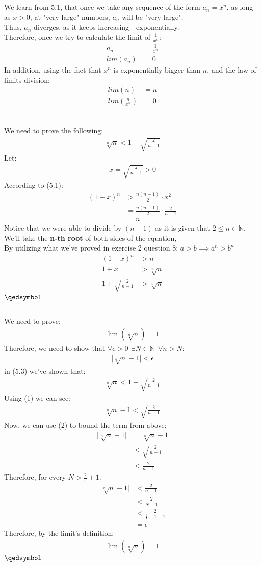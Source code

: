 \documentclass[a4paper, 12pt]{article}
\newcommand{\sub}[1]{\subsection{\underline{#1}}}
\newcommand{\N}{\ensuremath{\mathbb{N}}}
\newcommand{\eq}[1]{\begin{align*}#1\end{align*}}
\newcommand{\eqn}[1]{\begin{align}#1\end{align}}
\renewcommand{\qed}{\hfill\(\qedsymbol\)}
\begin{document}
\section{}
\setcounter{subsection}{1}
\sub{}
We learn from 5.1, that once we take any sequence of the form $a_n=x^n$, as long as $x>0$, at "very large" numbers, $a_n$ will be "very large".\\
Thus, $a_n$ diverges, as it keeps increasing - exponentially.\\
Therefore, once we try to calculate the limit of $\frac{1}{x^n}$:
\eq{
    a_n&=\frac{1}{x^n}\\
    lim(a_n)&=0
}
In addition, using the fact that $x^n$ is exponentially bigger than $n$, and the law of limits division:
\eq{
    lim(n)&=n\\
    lim(\frac{n}{x^n})&=0\\
}
\sub{}
We need to prove the following:
\eq{
    \sqrt[n]{n}<1+\sqrt{\frac{2}{n-1}}
}
Let:
\eq{
    x=\sqrt{\frac{2}{n-1}}>0
}
According to (5.1):
\eq{
    (1+x)^n&>\frac{n(n-1)}{2}\cdot{x^2}\\
    &=\frac{n(n-1)}{2}\cdot\frac{2}{n-1}\\
    &=n
}
Notice that we were able to divide by $(n-1)$ as it is given that $2\leq{n}\in\N$.\\
We'll take the \textbf{n-th root} of both sides of the equation,\\
By utilizing what we've proved in exercise 2 question 8: $a>b\implies a^n>b^n$
\eq{
    (1+x)^n&>n\\
    1+x&>\sqrt[n]{n}\\
    1+\sqrt{\frac{2}{n-1}}&>\sqrt[n]{n}
}
\qed\pagebreak
\sub{}
We need to prove:
\eq{
    \lim(\sqrt[n]{n})=1
}
Therefore, we need to show that $\forall\epsilon>0~~\exists{N}\in\N~~\forall{n}>N$:
\eq{
    \bigg|\sqrt[n]{n}-1\bigg|<\epsilon
}
in (5.3) we've shown that:
\eqn{
    \sqrt[n]{n}<1+\sqrt{\frac{2}{n-1}}
}
Using (1) we can see:
\eqn{
    \sqrt[n]{n}-1<\sqrt{\frac{2}{n-1}}
}
Now, we can use (2) to bound the term from above:
\eq{
    \bigg|\sqrt[n]{n}-1\bigg|&=\sqrt[n]{n}-1\\
    &<\sqrt{\frac{2}{n-1}}\\
    &<\frac{2}{n-1}
}
Therefore, for every $N>\frac{2}{\epsilon}+1$:
\eq{
    \bigg|\sqrt[n]{n}-1\bigg|&<\frac{2}{n-1}\\
    &<\frac{2}{N-1}\\
    &<\frac{2}{\frac{2}{\epsilon}+1-1}\\
    &=\epsilon
}
Therefore, by the limit's definition:
\eq{
    \lim(\sqrt[n]{n})=1
}
\qed\pagebreak
\end{document}
